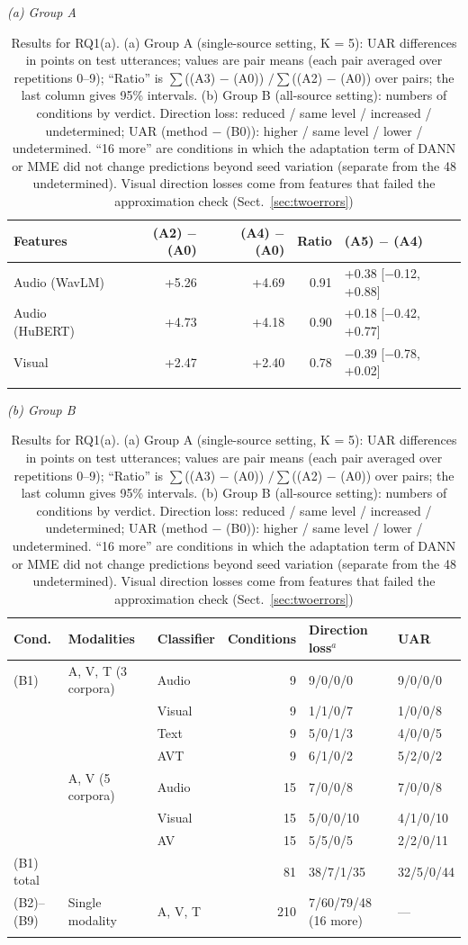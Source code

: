 \begin{table}[!htbp]
\caption{Results for RQ1(a). (a) Group A (single-source setting, K = 5): UAR differences in points on test utterances; values are pair means (each pair averaged over repetitions 0--9); ``Ratio'' is $\sum$((A3) $-$ (A0)) $/ \sum$((A2) $-$ (A0)) over pairs; the last column gives 95\% intervals. (b) Group B (all-source setting): numbers of conditions by verdict. Direction loss: reduced / same level / increased / undetermined; UAR (method $-$ (B0)): higher / same level / lower / undetermined. ``16 more'' are conditions in which the adaptation term of DANN or MME did not change predictions beyond seed variation (separate from the 48 undetermined). Visual direction losses come from features that failed the approximation check (Sect.~\ref{sec:twoerrors})}\label{tab:rq1a}
\footnotesize
\textit{(a) Group A}\par\smallskip
\begin{tabular}{@{}lrrrl@{}}
\toprule
Features & (A2) $-$ (A0) & (A4) $-$ (A0) & Ratio & (A5) $-$ (A4) \\
\midrule
Audio (WavLM) & +5.26 & +4.69 & 0.91 & +0.38 [$-$0.12, +0.88] \\
Audio (HuBERT) & +4.73 & +4.18 & 0.90 & +0.18 [$-$0.42, +0.77] \\
Visual & +2.47 & +2.40 & 0.78 & $-$0.39 [$-$0.78, +0.02] \\
\botrule
\end{tabular}\par\medskip
\textit{(b) Group B}\par\smallskip
\begin{tabular}{@{}lllrll@{}}
\toprule
Cond. & Modalities & Classifier & Conditions & Direction loss$^{a}$ & UAR \\
\midrule
(B1) & A, V, T (3 corpora) & Audio & 9 & 9/0/0/0 & 9/0/0/0 \\
 &  & Visual & 9 & 1/1/0/7 & 1/0/0/8 \\
 &  & Text & 9 & 5/0/1/3 & 4/0/0/5 \\
 &  & AVT & 9 & 6/1/0/2 & 5/2/0/2 \\
 & A, V (5 corpora) & Audio & 15 & 7/0/0/8 & 7/0/0/8 \\
 &  & Visual & 15 & 5/0/0/10 & 4/1/0/10 \\
 &  & AV & 15 & 5/5/0/5 & 2/2/0/11 \\
\midrule
(B1) total & & & 81 & 38/7/1/35 & 32/5/0/44 \\
(B2)--(B9) & Single modality & A, V, T & 210 & 7/60/79/48 (16 more) & --- \\
\botrule
\end{tabular}

\end{table}

